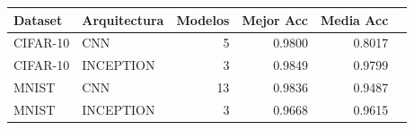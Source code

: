 \begin{tabular}{llrrrr}
\toprule
Dataset & Arquitectura & Modelos & Mejor Acc & Media Acc \\
\midrule
CIFAR-10 & CNN & 5 & 0.9800 & 0.8017 \\
CIFAR-10 & INCEPTION & 3 & 0.9849 & 0.9799 \\
MNIST & CNN & 13 & 0.9836 & 0.9487 \\
MNIST & INCEPTION & 3 & 0.9668 & 0.9615 \\
\bottomrule
\end{tabular}